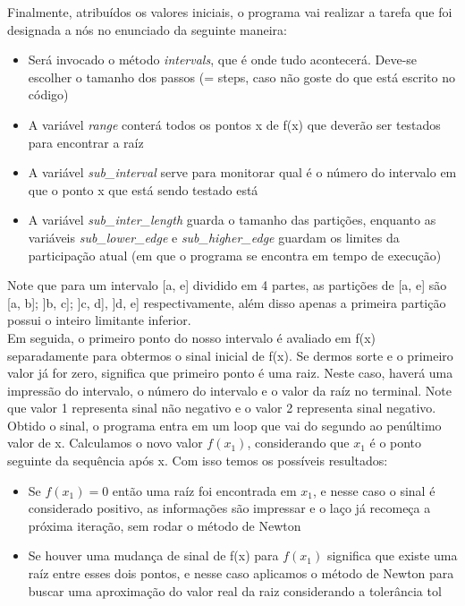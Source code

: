   Finalmente, atribuídos os valores iniciais, o programa vai realizar a tarefa que foi designada a nós no enunciado da seguinte maneira:\\
  \begin{itemize}
  \item{Será invocado o método \textit{intervals}, que é onde tudo acontecerá. Deve-se escolher o tamanho dos passos (= steps, caso não goste do que está escrito no código)}
  \item{A variável \textit{range} conterá todos os pontos x de f(x) que deverão ser testados para encontrar a raíz}
  \item{A variável \textit{sub\_interval} serve para monitorar qual é o número do intervalo em que o ponto x que está sendo testado está}
  \item{A variável \textit{sub\_inter\_length} guarda o tamanho das partições, enquanto as variáveis \textit{sub\_lower\_edge} e \textit{sub\_higher\_edge}
  guardam os limites da participação atual (em que o programa se encontra em tempo de execução)}
  \end{itemize}

  Note que para um intervalo [a, e] dividido em 4 partes, as partições de [a, e] são [a, b]; ]b, c]; ]c, d], ]d, e] respectivamente, além disso apenas a primeira partição possui o inteiro limitante inferior.\\
  
  Em seguida, o primeiro ponto do nosso intervalo é avaliado em f(x) separadamente para obtermos o sinal inicial de f(x). Se dermos sorte e o primeiro valor já for zero, significa que primeiro ponto é uma raiz. Neste caso, haverá uma impressão do intervalo, o número do intervalo e o valor da raíz no terminal. Note que valor 1 representa sinal não negativo e o valor 2 representa sinal negativo.\\

  Obtido o sinal, o programa entra em um loop que vai do segundo ao penúltimo valor de x. Calculamos o novo valor $f(x_1)$, considerando que $x_1$ é o ponto seguinte da sequência após x. Com isso temos os possíveis resultados:\\

  \begin{itemize}
  \item{Se $f(x_1) = 0$ então uma raíz foi encontrada em $x_1$, e nesse caso o sinal é considerado positivo, as informações são impressar e o laço já recomeça a próxima iteração, sem rodar o método de Newton}
  \item{Se houver uma mudança de sinal de f(x) para $f(x_1)$ significa que existe uma raíz entre esses dois pontos, e nesse caso aplicamos o método de Newton para buscar uma aproximação do valor real da raiz considerando a tolerância tol}
  \end{itemize}


